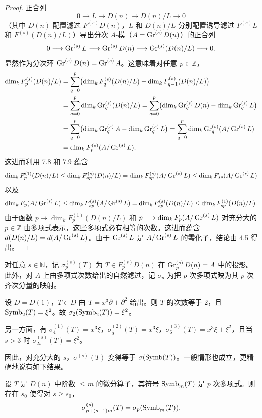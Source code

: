 \begin{proof}
正合列
$$0\longrightarrow L\longrightarrow D(n)\longrightarrow D(n)/L\longrightarrow 0$$
（其中 $D(n)$ 配置滤过 $F^{(s)}D(n)$，$L$ 和 $D(n)/L$ 分别配置诱导滤过 $F^{(s)}L$ 和 $F^{(s)}(D(n)/L)$）导出分次 $A$-模（$A=\operatorname{Gr}^{(s)}D(n)$）的正合列
$$0\longrightarrow\operatorname{Gr}^{(s)}L\longrightarrow\operatorname{Gr}^{(s)}D(n)\longrightarrow\operatorname{Gr}^{(s)}(D(n)/L)\longrightarrow 0.$$
显然作为分次环 $\operatorname{Gr}^{(s)}D(n)=\operatorname{Gr}^{(s)}A$。这意味着对任意 $p\in\mathbb{Z}$，
\begin{align*}
\dim_k F^{(s)}_p(D(n)/L)&=\sum_{q=0}^{p}\bigl(\dim_k F^{(s)}_q(D(n)/L)-\dim_k F^{(s)}_{q-1}(D(n)/L)\bigr)\\
&=\sum_{q=0}^{p}\dim_k\operatorname{Gr}^{(s)}_q(D(n)/L)=\sum_{q=0}^{p}\bigl(\dim_k\operatorname{Gr}^{(s)}_q D(n)-\dim_k\operatorname{Gr}^{(s)}_q L\bigr)\\
&=\sum_{q=0}^{p}\bigl(\dim_k\operatorname{Gr}^{(s)}_q A-\dim_k\operatorname{Gr}^{(s)}_q L\bigr)=\sum_{q=0}^{p}\dim_k\operatorname{Gr}^{(s)}_q(A/\operatorname{Gr}^{(s)}L)\\
&=\dim_k F^{(s)}_p(A/\operatorname{Gr}^{(s)}L).
\end{align*}
这进而利用 7.8 和 7.9 蕴含
$$\dim_k F^{(1)}_p(D(n)/L)\le\dim_k F^{(s)}_{sp}(D(n)/L)=\dim_k F^{(s)}_{sp}(A/\operatorname{Gr}^{(s)}L)\le\dim_k F_{sp}(A/\operatorname{Gr}^{(s)}L)$$
以及
$$\dim_k F_p(A/\operatorname{Gr}^{(s)}L)\le\dim_k F^{(s)}_{sp}(A/\operatorname{Gr}^{(s)}L)=\dim_k F^{(s)}_{sp}(D(n)/L)\le\dim_k F^{(1)}_{sp}(D(n)/L).$$
由于函数 $p\longmapsto\dim_k F^{(1)}_p(D(n)/L)$ 和 $p\longmapsto\dim_k F_p(A/\operatorname{Gr}^{(s)}L)$ 对充分大的 $p\in\mathbb{Z}$ 由多项式表示，这些多项式必有相等的次数。这进而蕴含 $d(D(n)/L)=d(A/\operatorname{Gr}^{(s)}L)$。由于 $\operatorname{Gr}^{(s)}L$ 是 $A/\operatorname{Gr}^{(s)}L$ 的零化子，结论由 4.5 得出。
\end{proof}

对任意 $s\in\mathbb{N}$，记 $\sigma^{(s)}_p(T)$ 为 $T\in F^{(s)}_p D(n)$ 在 $\operatorname{Gr}^{(s)}_p D(n)=A$ 中的投影。此外，对 $A$ 上由多项式次数给出的自然滤过，记 $\sigma_p$ 为把 $p$ 次多项式映为其 $p$ 次齐次分量的映射。

\begin{example}
设 $D=D(1)$，$T\in D$ 由 $T=x^3\partial+\partial^2$ 给出。则 $T$ 的次数等于 $2$，且 $\operatorname{Symb}_2(T)=\xi^2$。故 $\sigma_2(\operatorname{Symb}_2(T))=\xi^2$。

另一方面，有 $\sigma^{(1)}_4(T)=x^3\xi$，$\sigma^{(2)}_5(T)=x^3\xi$，$\sigma^{(3)}_6(T)=x^3\xi+\xi^2$，且当 $s>3$ 时 $\sigma^{(s)}_{2s}(T)=\xi^2$。
\end{example}

因此，对充分大的 $s$，$\sigma^{(s)}(T)$ 变得等于 $\sigma(\operatorname{Symb}(T))$。一般情形也成立，更精确地说有如下结果。

\begin{lemma}
设 $T$ 是 $D(n)$ 中阶数 $\le m$ 的微分算子，其符号 $\operatorname{Symb}_m(T)$ 是 $p$ 次多项式。则存在 $s_0$ 使得对 $s\ge s_0$，
$$\sigma^{(s)}_{p+(s-1)m}(T)=\sigma_p(\operatorname{Symb}_m(T)).$$
\end{lemma}


